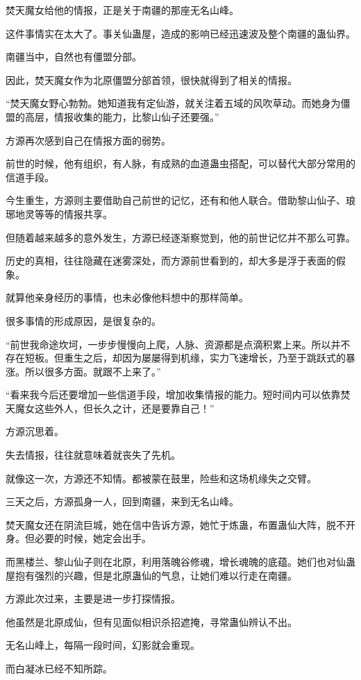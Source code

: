 \begin{this_body}
焚天魔女给他的情报，正是关于南疆的那座无名山峰。

这件事情实在太大了。事关仙蛊屋，造成的影响已经迅速波及整个南疆的蛊仙界。

南疆当中，自然也有僵盟分部。

因此，焚天魔女作为北原僵盟分部首领，很快就得到了相关的情报。

“焚天魔女野心勃勃。她知道我有定仙游，就关注着五域的风吹草动。而她身为僵盟的高层，情报收集的能力，比黎山仙子还要强。”

方源再次感到自己在情报方面的弱势。

前世的时候，他有组织，有人脉，有成熟的血道蛊虫搭配，可以替代大部分常用的信道手段。

今生重生，方源则主要借助自己前世的记忆，还有和他人联合。借助黎山仙子、琅琊地灵等等的情报共享。

但随着越来越多的意外发生，方源已经逐渐察觉到，他的前世记忆并不那么可靠。

历史的真相，往往隐藏在迷雾深处，而方源前世看到的，却大多是浮于表面的假象。

就算他亲身经历的事情，也未必像他料想中的那样简单。

很多事情的形成原因，是很复杂的。

“前世我命途坎坷，一步步慢慢向上爬，人脉、资源都是点滴积累上来。所以并不存在短板。但重生之后，却因为屡屡得到机缘，实力飞速增长，乃至于跳跃式的暴涨。所以很多方面。就跟不上来了。”

“看来我今后还要增加一些信道手段，增加收集情报的能力。短时间内可以依靠焚天魔女这些外人，但长久之计，还是要靠自己！”

方源沉思着。

失去情报，往往就意味着就丧失了先机。

就像这一次，方源还不知情。都被蒙在鼓里，险些和这场机缘失之交臂。

三天之后，方源孤身一人，回到南疆，来到无名山峰。

焚天魔女还在阴流巨城，她在信中告诉方源，她忙于炼蛊，布置蛊仙大阵，脱不开身。但必要的时候，她定会出手。

而黑楼兰、黎山仙子则在北原，利用落魄谷修魂，增长魂魄的底蕴。她们也对仙蛊屋抱有强烈的兴趣，但是北原蛊仙的气息，让她们难以行走在南疆。

方源此次过来，主要是进一步打探情报。

他虽然是北原成仙，但有见面似相识杀招遮掩，寻常蛊仙辨认不出。

无名山峰上，每隔一段时间，幻影就会重现。

而白凝冰已经不知所踪。


\end{this_body}
